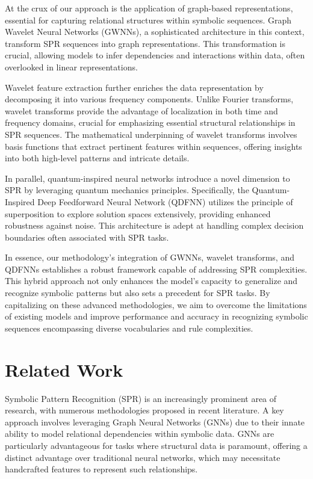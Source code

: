 \documentclass{article}
\begin{document}
At the crux of our approach is the application of graph-based representations, essential for capturing relational structures within symbolic sequences. Graph Wavelet Neural Networks (GWNNs), a sophisticated architecture in this context, transform SPR sequences into graph representations. This transformation is crucial, allowing models to infer dependencies and interactions within data, often overlooked in linear representations.

Wavelet feature extraction further enriches the data representation by decomposing it into various frequency components. Unlike Fourier transforms, wavelet transforms provide the advantage of localization in both time and frequency domains, crucial for emphasizing essential structural relationships in SPR sequences. The mathematical underpinning of wavelet transforms involves basis functions that extract pertinent features within sequences, offering insights into both high-level patterns and intricate details.

In parallel, quantum-inspired neural networks introduce a novel dimension to SPR by leveraging quantum mechanics principles. Specifically, the Quantum-Inspired Deep Feedforward Neural Network (QDFNN) utilizes the principle of superposition to explore solution spaces extensively, providing enhanced robustness against noise. This architecture is adept at handling complex decision boundaries often associated with SPR tasks.

In essence, our methodology's integration of GWNNs, wavelet transforms, and QDFNNs establishes a robust framework capable of addressing SPR complexities. This hybrid approach not only enhances the model’s capacity to generalize and recognize symbolic patterns but also sets a precedent for SPR tasks. By capitalizing on these advanced methodologies, we aim to overcome the limitations of existing models and improve performance and accuracy in recognizing symbolic sequences encompassing diverse vocabularies and rule complexities.

\section{Related Work}

Symbolic Pattern Recognition (SPR) is an increasingly prominent area of research, with numerous methodologies proposed in recent literature. A key approach involves leveraging Graph Neural Networks (GNNs) due to their innate ability to model relational dependencies within symbolic data. GNNs are particularly advantageous for tasks where structural data is paramount, offering a distinct advantage over traditional neural networks, which may necessitate handcrafted features to represent such relationships.
\end{document}
